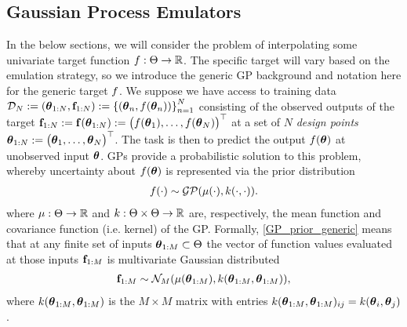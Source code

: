 \documentclass[12pt]{article}
\begin{document}
\subsection{Gaussian Process Emulators}
In the below sections, we will consider the problem of interpolating some univariate target function $f: \Theta \to \mathbb{R}$. The specific target will vary based on the 
emulation strategy, so we introduce the generic GP background and notation here for the generic target $f$. We suppose we have access to training data 
$\mathcal{D}_{N} := (\boldsymbol{\theta}_{1:N}, \mathbf{f}_{1:N}) := \left\{(\boldsymbol{\theta}_{n}, f(\boldsymbol{\theta}_{n}))\right\}_{n = 1}^{N}$ consisting of the observed outputs of the target $\mathbf{f}_{1:N} := \mathbf{f}(\boldsymbol{\theta}_{1:N}) :=  \begin{pmatrix} f(\boldsymbol{\theta}_1), \dots, f(\boldsymbol{\theta}_N) \end{pmatrix}^\top$ at a set of $N$ 
\textit{design points} $\boldsymbol{\theta}_{1:N} := \begin{pmatrix} \boldsymbol{\theta}_1, \dots, \boldsymbol{\theta}_N \end{pmatrix}^\top$. The task is then to predict the output $f(\boldsymbol{\theta})$ at unobserved input $\boldsymbol{\theta}$. GPs provide a probabilistic solution to this problem, 
whereby uncertainty about $f(\boldsymbol{\theta})$ is represented via the prior distribution 
\begin{align}
f(\cdot) \sim \mathcal{GP}(\mu(\cdot), k(\cdot, \cdot)). \label{GP_prior_generic}
\end{align}
where $\mu: \Theta \to \mathbb{R}$ and $k: \Theta \times \Theta \to \mathbb{R}$ are, respectively, the mean function and covariance function (i.e. kernel)
of the GP. Formally, \ref{GP_prior_generic} means that at any finite set of inputs $\boldsymbol{\theta}_{1:M} \subset \Theta$ the vector of function values evaluated at those inputs 
$\mathbf{f}_{1:M}$ is multivariate Gaussian distributed
\begin{align}
\mathbf{f}_{1:M} \sim \mathcal{N}_{M}(\mu(\boldsymbol{\theta}_{1:M}), k(\boldsymbol{\theta}_{1:M}, \boldsymbol{\theta}_{1:M})),
\end{align}
where $k(\boldsymbol{\theta}_{1:M}, \boldsymbol{\theta}_{1:M})$ is the $M \times M$ matrix with entries $k(\boldsymbol{\theta}_{1:M}, \boldsymbol{\theta}_{1:M})_{ij} = k(\boldsymbol{\theta}_i, \boldsymbol{\theta}_j)$.
\end{document}
